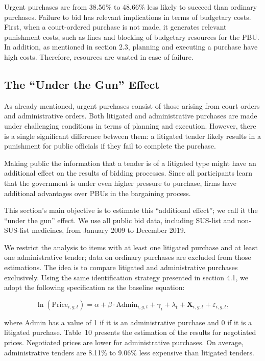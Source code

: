 Urgent purchases are from 38.56\% to 48.66\% less likely to succeed than ordinary purchases. Failure to bid has relevant implications in terms of budgetary costs. First, when a court-ordered purchase is not made, it generates relevant punishment costs, such as fines and blocking of budgetary resources for the PBU. In addition, as mentioned in section 2.3, planning and executing a purchase have high costs. Therefore, resources are wasted in case of failure.

\subsection{The “Under the Gun” Effect}
As already mentioned, urgent purchases consist of those arising from court orders and administrative orders. Both litigated and administrative purchases are made under challenging conditions in terms of planning and execution. However, there is a single significant difference between them: a litigated tender likely results in a punishment for public officials if they fail to complete the purchase.

Making public the information that a tender is of a litigated type might have an additional effect on the results of bidding processes. Since all participants learn that the government is under even higher pressure to purchase, firms have additional advantages over PBUs in the bargaining process.

This section’s main objective is to estimate this “additional effect”; we call it the “under the gun” effect. We use all public bid data, including SUS-list and non-SUS-list medicines, from January 2009 to December 2019.

We restrict the analysis to items with at least one litigated purchase and at least one administrative tender; data on ordinary purchases are excluded from those estimations. The idea is to compare litigated and administrative purchases exclusively. Using the same identification strategy presented in section 4.1, we adopt the following specification as the baseline equation:

\[
\ln(\text{Price}_{i,g,t}) = \alpha + \beta \cdot \text{Admin}_{i,g,t} + \gamma_{i} + \lambda_{t} + \mathbf{X}_{i,g,t} + \varepsilon_{i,g,t},
\]

where $\text{Admin}$ has a value of 1 if it is an administrative purchase and 0 if it is a litigated purchase. Table~10 presents the estimation of the results for negotiated prices. Negotiated prices are lower for administrative purchases. On average, administrative tenders are 8.11\% to 9.06\% less expensive than litigated tenders.

